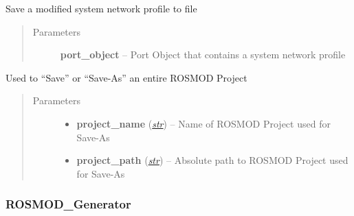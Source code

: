 \documentclass[letterpaper,10pt,english]{sphinxmanual}
\begin{document}
\begin{fulllineitems}
\begin{fulllineitems}
\label{class_Project:ROSMOD_Project.save_snp}
Save a modified system network profile to file
\begin{quote}\begin{description}
\item[{Parameters}] \leavevmode
\textbf{port\_object} -- Port Object that contains a system network profile

\end{description}\end{quote}

\end{fulllineitems}


\begin{fulllineitems}
\label{class_Project:ROSMOD_Project.save}
Used to ``Save'' or ``Save-As'' an entire ROSMOD Project
\begin{quote}\begin{description}
\item[{Parameters}] \leavevmode\begin{itemize}
\item {} 
\textbf{project\_name} (\href{http://docs.python.org/library/functions.html\#str}{\emph{str}}) -- Name of ROSMOD Project used for Save-As

\item {} 
\textbf{project\_path} (\href{http://docs.python.org/library/functions.html\#str}{\emph{str}}) -- Absolute path to ROSMOD Project used for Save-As

\end{itemize}

\end{description}\end{quote}

\end{fulllineitems}


\end{fulllineitems}



\subsubsection{ROSMOD\_Generator}
\label{class_Generator:rosmod-generator}\label{class_Generator::doc}
\end{document}
